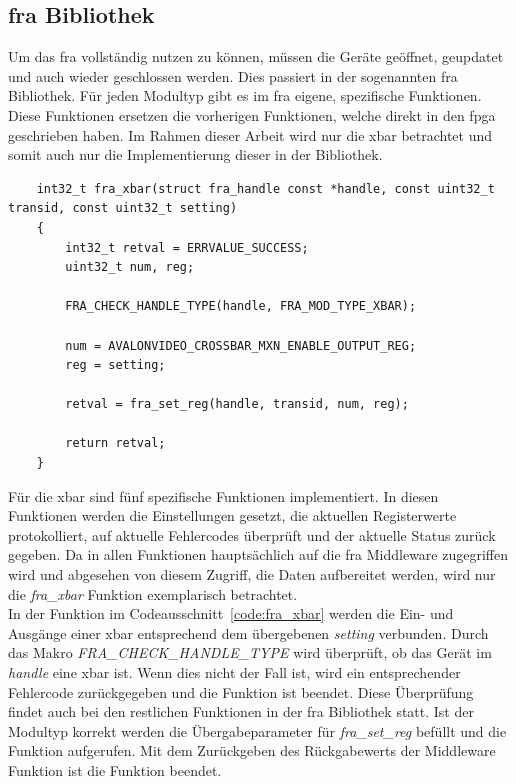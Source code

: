 \subsection{\ac{fra} Bibliothek}
Um das \ac{fra} vollständig nutzen zu können, müssen die Geräte geöffnet, geupdatet und auch wieder geschlossen werden. Dies passiert in der sogenannten \ac{fra} Bibliothek. 
Für jeden Modultyp gibt es im \ac{fra} eigene, spezifische Funktionen. Diese Funktionen ersetzen die vorherigen Funktionen, welche direkt in den \ac{fpga} geschrieben haben. Im Rahmen dieser Arbeit wird nur die \ac{xbar} betrachtet und somit auch nur die Implementierung dieser in der Bibliothek.

\begin{lstfloat}
	\begin{lstlisting}
	int32_t fra_xbar(struct fra_handle const *handle, const uint32_t transid, const uint32_t setting)
	{
		int32_t retval = ERRVALUE_SUCCESS;
		uint32_t num, reg;
		
		FRA_CHECK_HANDLE_TYPE(handle, FRA_MOD_TYPE_XBAR);
		
		num = AVALONVIDEO_CROSSBAR_MXN_ENABLE_OUTPUT_REG;
		reg = setting;
		
		retval = fra_set_reg(handle, transid, num, reg);  
		
		return retval;
	}
	\end{lstlisting}
\end{lstfloat}

Für die \ac{xbar} sind fünf spezifische Funktionen implementiert. In diesen Funktionen werden die Einstellungen gesetzt, die aktuellen Registerwerte protokolliert, auf aktuelle Fehlercodes überprüft und der aktuelle Status zurück gegeben. Da in allen Funktionen hauptsächlich auf die \ac{fra} Middleware zugegriffen wird und abgesehen von diesem Zugriff, die Daten aufbereitet werden, wird nur die \textit{fra\_xbar} Funktion exemplarisch betrachtet.\\

In der Funktion im Codeausschnitt~\ref{code:fra_xbar} werden die Ein- und Ausgänge einer \ac{xbar} entsprechend dem übergebenen \textit{setting} verbunden.
Durch das Makro \textit{FRA\_CHECK\_HANDLE\_TYPE} wird überprüft, ob das Gerät im \textit{handle} eine \ac{xbar} ist. Wenn dies nicht der Fall ist, wird ein entsprechender Fehlercode zurückgegeben und die Funktion ist beendet. Diese Überprüfung findet auch bei den restlichen Funktionen in der \ac{fra} Bibliothek statt.
Ist der Modultyp korrekt werden die Übergabeparameter für \textit{fra\_set\_reg} befüllt und die Funktion aufgerufen. Mit dem Zurückgeben des Rückgabewerts der Middleware Funktion ist die Funktion beendet.\\

